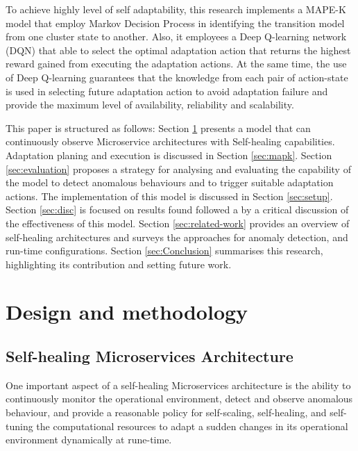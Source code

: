 \documentclass{ieeeaccess}
\begin{document}
To achieve highly level of self adaptability, this research implements a MAPE-K model that employ Markov Decision Process in identifying the transition model from one cluster state to another.  Also, it employees a Deep Q-learning network (DQN) that able to select the optimal adaptation action that returns the highest reward gained from executing the adaptation actions. At the same time, the use of  Deep Q-learning guarantees that the knowledge from each pair of action-state is used in selecting future adaptation action to avoid adaptation failure and provide the maximum level of availability, reliability and scalability.  

This paper is structured as follows:  Section \ref{sec:modelling} presents a model that can continuously observe Microservice architectures with Self-healing capabilities. Adaptation planing and execution is discussed in Section \ref{sec:mapk}. 
Section \ref{sec:evaluation} proposes a strategy for analysing and evaluating the capability of the model  to detect anomalous behaviours and to trigger suitable adaptation actions. The implementation of this model is discussed in Section \ref{sec:setup}. Section \ref{sec:disc} is focused on results found followed a by a critical discussion of the effectiveness of this model. Section \ref{sec:related-work} provides an overview of self-healing architectures and surveys the approaches for  anomaly detection, and run-time configurations. Section \ref{sec:Conclusion} summarises this research, highlighting its contribution and setting future work.

%
\section{Design and methodology}
\label{sec:modelling}
\subsection{Self-healing Microservices Architecture}
One important aspect of a self-healing Microservices architecture is the ability to continuously monitor the operational environment, detect and observe anomalous behaviour, and provide a reasonable policy for self-scaling, self-healing, and self-tuning the computational resources to adapt a sudden changes in its operational environment dynamically at rune-time.  
 
\end{document}
